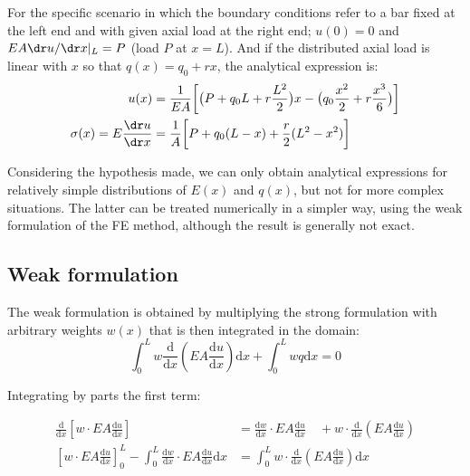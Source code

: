 \documentclass[spanish,a4paper,12pt]{article}
\begin{document}
For the specific scenario in which the boundary conditions refer to a bar fixed at the left end and with given axial load at the right end; $u(0)=0$ and $EA\dr u/\dr x|_{L}=P$ (load $P$ at $x=L$). And if the distributed axial load is linear with $x$ so that $q(x)=q_{0}+rx$, the analytical expression is:
\begin{equation}
\begin{split}
	u(x) &= \frac{1}{EA}\bigg[ 
	\big(P+q_{0}L+r\frac{L^{2}}{2}\big)x - \big(q_{0}\frac{x^{2}}{2}+r\frac{x^{3}}{6}\big) \bigg]
	\\
	\sigma(x) = E\frac{\dr u}{\dr x}
	&=  \frac{1}{A}\bigg[ 
	P+q_{0}(L-x)+\frac{r}{2}(L^{2}-x^{2}) \bigg]
\end{split}
\label{eq:analitica}
\end{equation}

Considering the hypothesis made, we can only obtain analytical expressions for relatively simple distributions of $E(x)$ and $q(x)$, but not for more complex situations. The latter can be treated numerically in a simpler way, using the weak formulation of the FE method, although the result is generally not exact. 

\subsection{Weak formulation}
\label{sec:debil}

The weak formulation is obtained by multiplying the strong formulation with arbitrary weights $w(x)$ that is then integrated in the domain:
\begin{equation}\label{eq:debil}
\int_{0}^{L} w \frac{\mathrm{d}}{\mathrm{d} x}\left(EA \frac{\mathrm{d} u}{\mathrm{d} x}\right) \mathrm{d} x+\int_{0}^{L} w q \mathrm{d} x=0
\end{equation}

Integrating by parts the first term:

\begin{align}\label{eq:partes}
\frac{\mathrm{d}}{\mathrm{d} x}\left[w \cdot EA \frac{\mathrm{d} u}{\mathrm{d} x}\right] &=\frac{\mathrm{d} w}{\mathrm{d} x} \cdot EA \frac{\mathrm{d} u}{\mathrm{d} x} \quad+w \cdot \frac{\mathrm{d}}{\mathrm{d} x}\left(EA \frac{\mathrm{d} u}{\mathrm{d} x}\right) \nonumber\\
\left[w \cdot EA \frac{\mathrm{d} u}{\mathrm{d} x}\right]_{0}^{L}-\int_{0}^{L} \frac{\mathrm{d} w}{\mathrm{d} x} \cdot EA \frac{\mathrm{d} u}{\mathrm{d} x} \mathrm{d} x &=\int_{0}^{L} w \cdot \frac{\mathrm{d}}{\mathrm{d} x}\left(EA \frac{\mathrm{d} u}{\mathrm{d} x}\right) \mathrm{d} x
\end{align}
\end{document}
